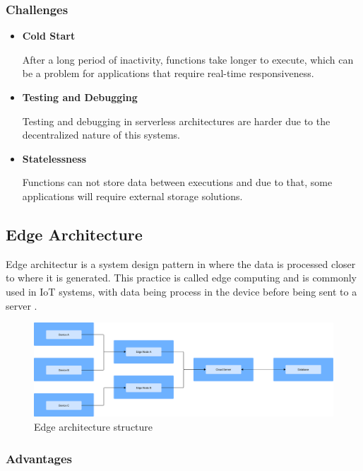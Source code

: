 \subsubsection{Challenges}
\begin{itemize}
	\item \textbf{Cold Start}

	      After a long period of inactivity, functions take longer to execute, which
	      can be a problem for applications that require real-time responsiveness\cite{s21030928}.

	\item \textbf{Testing and Debugging}

	      Testing and debugging in serverless architectures are harder due to the
	      decentralized nature of this systems\cite{meghla2023testing}.

	\item \textbf{Statelessness}

	      Functions can not store data between executions and due to that, some
	      applications will require external storage solutions\cite{meghla2023testing}.
\end{itemize}

\subsection{Edge Architecture}
Edge architectur is a system design pattern in where the data is processed
closer to where it is generated. This practice is called edge computing and
is commonly used in \gls{IoT} systems, with data being process in the device
before being sent to a server \cite{s20226441}.

\begin{figure}[H]
	\centering
	\includegraphics[width=\textwidth, height=0.5\textheight, keepaspectratio]{Chapters/Figures/Architectures/Edge.pdf}
	\caption{Edge architecture structure}
	\label{fig:architectures:edge}
\end{figure}

\subsubsection{Advantages}

